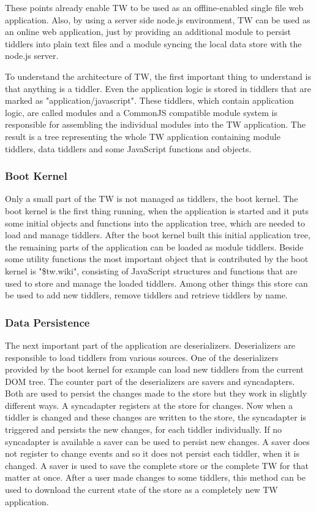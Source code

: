 \documentclass[12pt,a4paper]{article}
\newcommand{\todo}[1]{{\bf TODO: #1}\\
}
\begin{document}
These points already enable TW to be used as an offline-enabled single file web application.
Also, by using a server side node.js environment, TW can be used as an online web application, just by providing an additional module to persist tiddlers into plain text files and a module syncing the local data store with the node.js server.

To understand the architecture of TW, the first important thing to understand is that anything is a tiddler.
Even the application logic is stored in tiddlers that are marked as "application/javascript".
These tiddlers, which contain application logic, are called modules and a CommonJS compatible module system is responsible for assembling the individual modules into the TW application.
The result is a tree representing the whole TW application containing module tiddlers, data tiddlers and some JavaScript functions and objects.

\subsubsection*{Boot Kernel}
Only a small part of the TW is not managed as tiddlers, the boot kernel.
The boot kernel is the first thing running, when the application is started and it puts some initial objects and functions into the application tree, which are needed to load and manage tiddlers.
After the boot kernel built this initial application tree, the remaining parts of the application can be loaded as module tiddlers.
Beside some utility functions the most important object that is contributed by the boot kernel is "\$tw.wiki", consisting of JavaScript structures and functions that are used to store and manage the loaded tiddlers.
Among other things this store can be used to add new tiddlers, remove tiddlers and retrieve tiddlers by name.

\subsubsection*{Data Persistence}
The next important part of the application are deserializers. Deserializers are responsible to load tiddlers from various sources. One of the deserializers provided by the boot kernel for example can load new tiddlers from the current DOM tree.
The counter part of the deserializers are savers and syncadapters.
Both are used to persist the changes made to the store but they work in slightly different ways.
A syncadapter registers at the store for changes.
Now when a tiddler is changed and these changes are written to the store, the syncadapter is triggered and persists the new changes, for each tiddler individually.
If no syncadapter is available a saver can be used to persist new changes.
A saver does not register to change events and so it does not persist each tiddler, when it is changed.
A saver is used to save the complete store or the complete TW for that matter at once. After a user made changes to some tiddlers, this method can be used to download the current state of the store as a completely new TW application.
\end{document}
